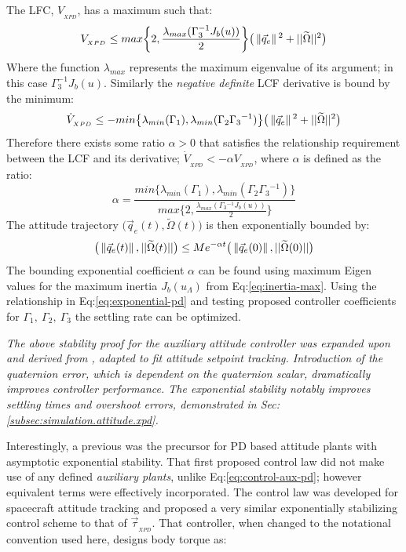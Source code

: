 The LFC, $V_{_{XPD}}$, has a maximum such that:
\begin{equation}
V_{_{XPD}}\leq max \bigg\{ 2,\frac{\lambda_{max}(\Gamma_3^{-1}J_b(u))}{2}\bigg\}\big(\left\lVert\vec{q}_e\right\rVert\text{}^2+||\widetilde{\Omega}||\text{}^2\big)
\end{equation}
Where the function $\lambda_{max}$ represents the maximum eigenvalue of its argument; in this case $\Gamma_3^{-1}J_b(u)$. Similarly the \emph{negative definite} LCF derivative is bound by the minimum:
\begin{equation}
\dot{V}_{_{XPD}} \leq -min \big\{ \lambda_{min}(\Gamma_1),\lambda_{min}(\Gamma_2\Gamma_3\text{}^{-1})\big\}\big(\left\lVert\vec{q}_e\right\rVert\text{}^2+||\widetilde{\Omega}||^2 \big)
\end{equation}
Therefore there exists some ratio $\alpha>0$ that satisfies the relationship requirement between the LCF and its derivative; $\dot{V}_{_{XPD}}< -\alpha V_{_{XPD}}$, where $\alpha$ is defined as the ratio:
\begin{equation}
\alpha=\frac{min\big\{\lambda_{min}(\Gamma_1),\lambda_{min}(\Gamma_2\Gamma_3\text{}^{-1})\big\}}{max\big\{2,\frac{\lambda_{max}(\Gamma_3\text{}^{-1}J_b(u))}{2}\big\}}
\end{equation}
The attitude trajectory $\big(\vec{q}_e(t),\widetilde{\Omega}(t)\big)$ is then exponentially bounded by:
\begin{equation}\label{eq:exponential-pd}
\big(\left\lVert\vec{q}_e(t)\right\rVert,||\widetilde{\Omega}(t)||\big)\leq Me^{-\alpha t}\big(\left\lVert\vec{q}_e(0)\right\rVert,||\widetilde{\Omega}(0)||\big)
\end{equation}
The bounding exponential coefficient $\alpha$ can be found using maximum Eigen values for the maximum inertia $J_b(u_{\Lambda})$ from Eq:\ref{eq:inertia-max}. Using the relationship in Eq:\ref{eq:exponential-pd} and testing proposed controller coefficients for $\Gamma_1,~\Gamma_2,~\Gamma_3$ the settling rate can be optimized.
\par
\emph{\color{Gray}The above stability proof for the auxiliary attitude controller was expanded upon and derived from \cite{attitudestabilization}, adapted to fit attitude setpoint tracking. Introduction of the quaternion error, which is dependent on the quaternion scalar, dramatically improves controller performance. The exponential stability notably improves settling times and overshoot errors, demonstrated in Sec:\ref{subsec:simulation.attitude.xpd}.}
\par
Interestingly, a previous \cite{robustattitude} was the precursor for PD based attitude plants with asymptotic exponential stability. That first proposed control law did not make use of any defined \emph{auxiliary plants}, unlike Eq:\ref{eq:control-aux-pd}; however equivalent terms were effectively incorporated. The control law was developed for spacecraft attitude tracking and proposed a very similar exponentially stabilizing control scheme to that of $\vec{\tau}_{_{XPD}}$. That controller, when changed to the notational convention used here, designs body torque as:
